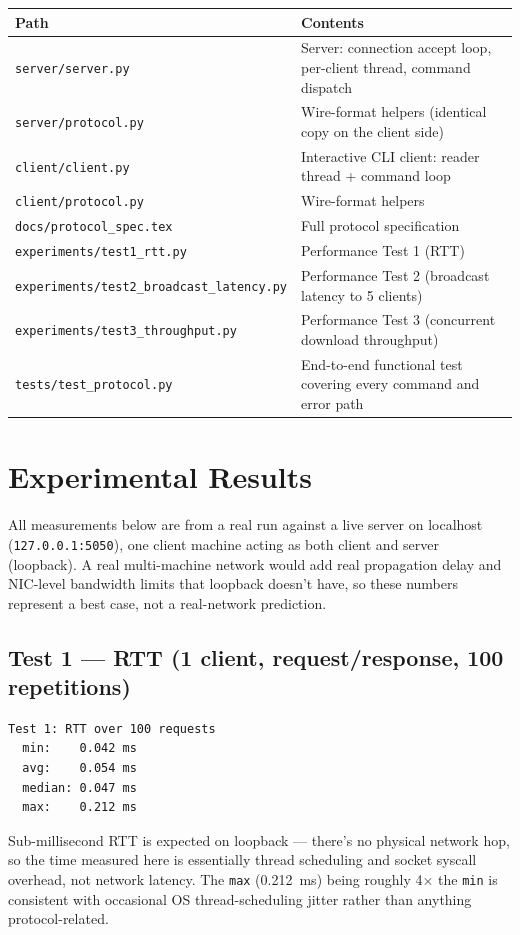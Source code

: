 \documentclass[11pt]{article}
\newcommand{\cmd}[1]{\texttt{#1}}
\begin{document}
\begin{longtable}{@{}p{5.2cm}p{9.3cm}@{}}
\toprule
\textbf{Path} & \textbf{Contents} \\
\midrule
\endhead
\cmd{server/server.py} & Server: connection accept loop, per-client thread, command dispatch \\
\cmd{server/protocol.py} & Wire-format helpers (identical copy on the client side) \\
\cmd{client/client.py} & Interactive CLI client: reader thread + command loop \\
\cmd{client/protocol.py} & Wire-format helpers \\
\cmd{docs/protocol\_spec.tex} & Full protocol specification \\
\cmd{experiments/test1\_rtt.py} & Performance Test 1 (RTT) \\
\cmd{experiments/test2\_broadcast\_latency.py} & Performance Test 2 (broadcast latency to 5 clients) \\
\cmd{experiments/test3\_throughput.py} & Performance Test 3 (concurrent download throughput) \\
\cmd{tests/test\_protocol.py} & End-to-end functional test covering every command and error path \\
\bottomrule
\end{longtable}

\section{Experimental Results}

All measurements below are from a real run against a live server on
localhost (\cmd{127.0.0.1:5050}), one client machine acting as both
client and server (loopback). A real multi-machine network would add
real propagation delay and NIC-level bandwidth limits that loopback
doesn't have, so these numbers represent a best case, not a
real-network prediction.

\subsection{Test 1 --- RTT (1 client, request/response, 100 repetitions)}

\begin{verbatim}
Test 1: RTT over 100 requests
  min:    0.042 ms
  avg:    0.054 ms
  median: 0.047 ms
  max:    0.212 ms
\end{verbatim}

Sub-millisecond RTT is expected on loopback --- there's no physical
network hop, so the time measured here is essentially thread scheduling
and socket syscall overhead, not network latency. The \texttt{max}
(0.212~ms) being roughly 4$\times$ the \texttt{min} is consistent with
occasional OS thread-scheduling jitter rather than anything
protocol-related.
\end{document}
